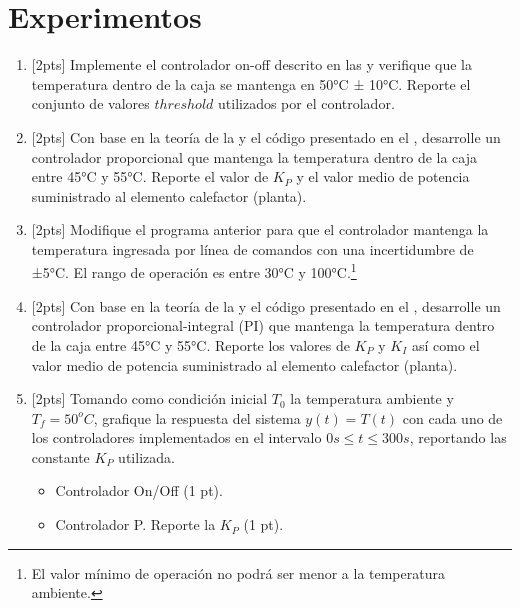 %
%


\section{Experimentos}%
\label{sec:experiments}

\begin{enumerate}
	\item{} [2pts] Implemente el controlador on-off descrito en las  y verifique que la temperatura dentro de la caja se mantenga en 50°C ± 10°C.
	Reporte el conjunto de valores $threshold$ utilizados por el controlador.%
	\label{enu:ctrl-onoff}

	\item{} [2pts] Con base en la teoría de la  y el código presentado en el , desarrolle un controlador proporcional que mantenga la temperatura dentro de la caja entre 45°C y 55°C.
	Reporte el valor de $K_P$ y el valor medio de potencia suministrado al elemento calefactor (planta).

	\item{} [2pts] Modifique el programa anterior para que el controlador mantenga la temperatura ingresada por línea de comandos con una incertidumbre de ±5°C. El rango de operación es entre 30°C y 100°C.\footnote{El valor mínimo de operación no podrá ser menor a la temperatura ambiente.}%
	\label{enu:ctrl-p}

	\item{} [2pts] Con base en la teoría de la  y el código presentado en el , desarrolle un controlador proporcional-integral (PI) que mantenga la temperatura dentro de la caja entre 45°C y 55°C.
	Reporte los valores de $K_P$ y $K_I$ así como el valor medio de potencia suministrado al elemento calefactor (planta).%
	\label{enu:ctrl-pi}

	\item{} [2pts] Tomando como condición inicial $T_0$ la temperatura ambiente y $T_f = 50^{o}C$, grafique la respuesta del sistema $y(t) = T(t)$ con cada uno de los controladores implementados en el intervalo $0s \leq t \leq 300s$, reportando las constante $K_P$ utilizada.%
	\label{enu:graph}
	\begin{itemize}[nosep]
		\item Controlador On/Off (1 pt).
		\item Controlador P. Reporte la $K_P$ (1 pt).
	\end{itemize}
\end{enumerate}

